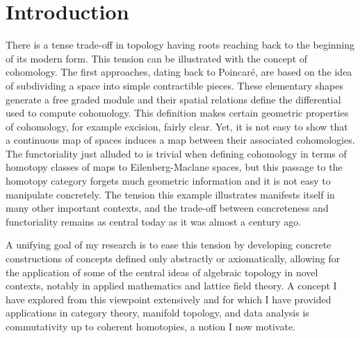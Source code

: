 
\section{Introduction} \label{s:introduction}

There is a tense trade-off in topology having roots reaching back to the beginning of its modern form.
This tension can be illustrated with the concept of cohomology.
The first approaches, dating back to Poincar\'e, are based on the idea of subdividing a space into simple contractible pieces.
These elementary shapes generate a free graded module and their spatial relations define the differential used to compute cohomology.
This definition makes certain geometric properties of cohomology, for example excision, fairly clear.
Yet, it is not easy to show that a continuous map of spaces induces a map between their associated cohomologies.
The functoriality just alluded to is trivial when defining cohomology in terms of homotopy classes of maps to Eilenberg-Maclane spaces, but this passage to the homotopy category forgets much geometric information and it is not easy to manipulate concretely.
The tension this example illustrates manifests itself in many other important contexts, and the trade-off between concreteness and functoriality remains as central today as it was almost a century ago.

A unifying goal of my research is to ease this tension by developing concrete constructions of concepts defined only abstractly or axiomatically, allowing for the application of some of the central ideas of algebraic topology in novel contexts, notably in applied mathematics and lattice field theory.
A concept I have explored from this viewpoint extensively and for which I have provided applications in category theory, manifold topology, and data analysis is commutativity up to coherent homotopies, a notion I now motivate.

